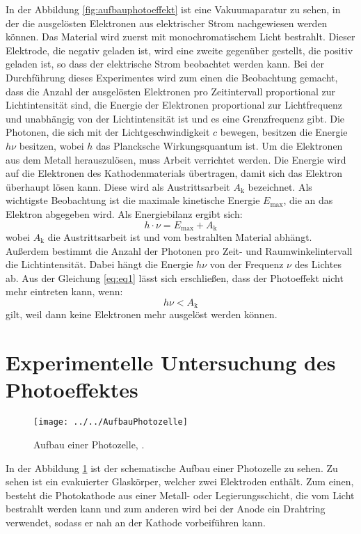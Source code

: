In der Abbildung \ref{fig:aufbauphotoeffekt} ist eine Vakuumaparatur zu sehen, in der die ausgelösten Elektronen aus elektrischer Strom nachgewiesen werden können. Das Material wird zuerst mit monochromatischem Licht bestrahlt. Dieser Elektrode, die negativ geladen ist, wird eine zweite gegenüber gestellt, die positiv geladen ist, so dass der elektrische Strom beobachtet werden kann. 
Bei der Durchführung dieses Experimentes wird zum einen die Beobachtung gemacht, dass die Anzahl der ausgelösten Elektronen pro Zeitintervall proportional zur Lichtintensität sind, die Energie der Elektronen proportional zur Lichtfrequenz und unabhängig von der Lichtintensität ist und es eine Grenzfrequenz gibt.
Die Photonen, die sich mit der Lichtgeschwindigkeit $c$ bewegen, besitzen die Energie $h\nu$ besitzen, wobei $h$ das Plancksche Wirkungsquantum ist. 
Um die Elektronen aus dem Metall herauszulösen, muss Arbeit verrichtet werden. Die Energie wird auf die Elektronen des Kathodenmaterials übertragen, damit sich das Elektron überhaupt lösen kann. Diese wird als Austrittsarbeit $A_\text{k}$ bezeichnet. Als wichtigste Beobachtung ist die maximale kinetische Energie $E_\text{max}$, die an das Elektron abgegeben wird. 
Als Energiebilanz ergibt sich:
\begin{equation}
\label{eq:eq1}
h \cdot \nu = E_\text{max} + A_\text{k}
\end{equation}
wobei $A_\text{k}$ die Austrittsarbeit ist und vom bestrahlten Material abhängt. Außerdem bestimmt die Anzahl der Photonen pro Zeit- und Raumwinkelintervall die Lichtintensität. Dabei hängt die Energie $h\nu$ von der Frequenz $\nu$ des Lichtes ab.
Aus der Gleichung \ref{eq:eq1} lässt sich erschließen, dass der Photoeffekt nicht mehr eintreten kann, wenn:
\begin{equation*}
h \nu < A_\text{k}
\end{equation*}
gilt, weil dann keine Elektronen mehr ausgelöst werden können. 

\section{Experimentelle Untersuchung des Photoeffektes}
\begin{figure}[h!]
	\centering
	\texttt{[image: ../../AufbauPhotozelle]}
	\caption{Aufbau einer Photozelle, \cite[4]{anleitung500}.}
	\label{fig:aufbauphotozelle}
\end{figure}
In der Abbildung \ref{fig:aufbauphotozelle} ist der schematische Aufbau einer Photozelle zu sehen. Zu sehen ist ein evakuierter Glaskörper, welcher zwei Elektroden enthält. Zum einen, besteht die Photokathode aus einer Metall- oder Legierungsschicht, die vom Licht bestrahlt werden kann und zum anderen wird bei der Anode ein Drahtring verwendet, sodass er nah an der Kathode vorbeiführen kann.

